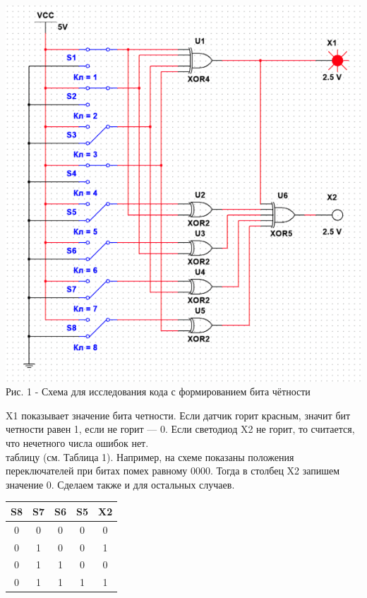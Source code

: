 \documentclass[14pt]{article}
\begin{document}
\begin{center}
    \includegraphics[width=1\linewidth]{img/scheme1.png}
    Рис. 1 - Схема для исследования кода с формированием бита чётности
\end{center}


 X1 показывает значение бита четности. Если датчик горит красным, значит бит четности равен 1, если не горит — 0. Если светодиод X2 не горит, то считается, что нечетного числа ошибок нет.\\
 таблицу (см. Таблица 1). Например, на схеме показаны положения переключателей при битах помех равному 0000. Тогда в столбец X2 запишем значение 0. Сделаем также и для остальных случаев.\\
\begin{table}[h]
\begin{tabular}{|c|c|c|c|c|}
\hline
S8 & S7 & S6 & S5 & X2 \\ \hline
0  & 0  & 0  & 0  & 0  \\ \hline
0  & 1  & 0  & 0  & 1  \\ \hline
0  & 1  & 1  & 0  & 0  \\ \hline
0  & 1  & 1  & 1  & 1  \\ \hline
\end{tabular}
\end{table}
\end{document}
